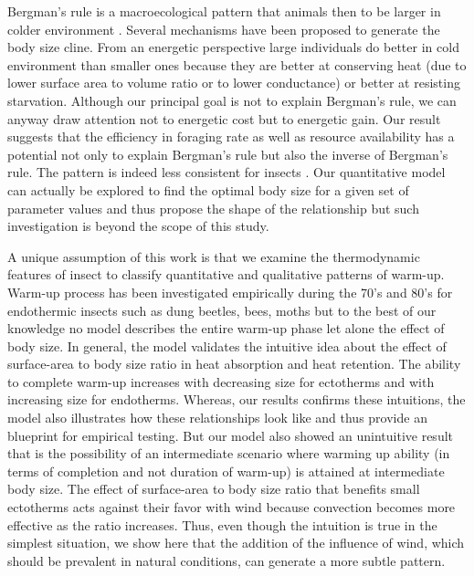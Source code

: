 Bergman's rule is a macroecological pattern that animals then to be larger in colder environment \citep{Bergman1847,Blackburn1999}.
Several mechanisms have been proposed to generate the body size cline.
From an energetic perspective large individuals do better in cold environment than smaller ones because they are better at conserving heat (due to lower surface area to volume ratio or to lower conductance) or better at resisting starvation. 
Although our principal goal is not to explain Bergman's rule, we can anyway draw attention not to energetic cost but to energetic gain.
Our result suggests that the efficiency in foraging rate as well as resource availability has a potential not only to explain Bergman's rule but also the inverse of Bergman's rule.
The pattern is indeed less consistent for insects  \citep{Cushman1993, Loder1997,Blackburn1999}.
Our quantitative model can actually be explored to find the optimal body size for a given set of parameter values and thus propose the shape of the relationship but such investigation is beyond the scope of this study.

A unique assumption of this work is that we examine the thermodynamic features of insect to classify quantitative and qualitative patterns of warm-up.
Warm-up process has been investigated empirically during the 70's and 80's for endothermic insects  such as dung beetles, bees, moths \citep{Heinrich1975, Bartholomew1978, Bartholomew1981} but to the best of our knowledge no model describes the entire warm-up phase let alone the effect of body size.
In general, the model validates the intuitive idea about  the effect of surface-area to body size ratio in heat absorption and heat retention.
The ability to complete warm-up increases with decreasing size for ectotherms and with increasing size for endotherms.
Whereas, our results confirms these intuitions, the model also illustrates how these relationships look like and thus provide an blueprint for empirical testing.
But our model also showed an unintuitive result that is the possibility of an intermediate scenario where warming up ability (in terms of completion and not duration of warm-up) is attained at intermediate body size. 
The effect of surface-area to body size ratio that benefits small ectotherms acts against their favor with wind because convection becomes more effective as the ratio increases.
Thus, even though the intuition is true in the simplest situation, we show here that the addition of the influence of wind, which should be prevalent in natural conditions, can generate a more subtle pattern.

